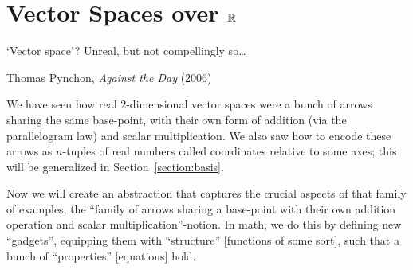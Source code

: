 \section{Vector Spaces over \texorpdfstring{$\mathbb{R}$}{R}}


\epigraph{‘Vector space’? Unreal, but not compellingly so\dots}{Thomas Pynchon, \textit{Against the Day} (2006)}

\M
We have seen how real $2$-dimensional vector spaces were a bunch of
arrows sharing the same base-point, with their own form of addition (via
the parallelogram law) and scalar multiplication. We also saw how to
encode these arrows as $n$-tuples of real numbers called coordinates
relative to some axes; this will be generalized in
Section~\ref{section:basis}.

Now we will create an abstraction that captures the
crucial aspects of that family of examples, the ``family of arrows
sharing a base-point with their own addition operation and scalar
multiplication''-notion. In math, we do this by defining new
``gadgets'', equipping them with ``structure'' [functions of some sort],
such that a bunch of ``properties'' [equations] hold. 

